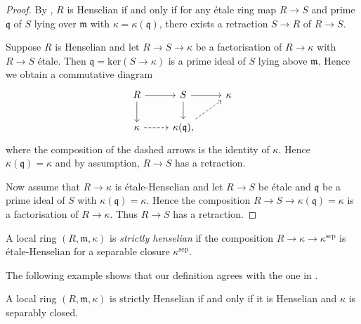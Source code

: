 \begin{proof}
    By {\cite[\href{https://stacks.math.columbia.edu/tag/04GG}{Tag 04GG}]{stacks-project}}, $R$ is Henselian if and only if
    for any étale ring map $R \to S$ and prime $\mathfrak{q}$ of $S$ lying over $\mathfrak{m}$ with $\kappa = \kappa(\mathfrak{q})$,
    there exists a retraction $S \to R$ of $R \to S$.

    Suppose $R$ is Henselian and let $R \to S \to \kappa$ be a factorisation of $R \to \kappa$ with $R \to S$ étale. Then
    $\mathfrak{q} = \mathrm{ker}(S \to \kappa)$ is a prime ideal of $S$ lying above $\mathfrak{m}$. Hence we obtain a commutative
    diagram
    \[
        \begin{tikzcd}
        R \arrow{r} \arrow{d} & S \arrow{r} \arrow{d} & \kappa \\
        \kappa \arrow[dashed]{r} & \kappa(\mathfrak{q}) \arrow[dashed]{ur},
        \end{tikzcd}
    \] where the composition of the dashed arrows is the identity of $\kappa$. Hence $\kappa(\mathfrak{q}) = \kappa$ and by assumption,
    $R \to S$ has a retraction.

    Now assume that $R \to \kappa$ is étale-Henselian and let $R \to S$ be étale and $\mathfrak{q}$ be a prime ideal of $S$ with
    $\kappa(\mathfrak{q}) = \kappa$. Hence the composition $R \to S \to \kappa(\mathfrak{q}) = \kappa$ is a factorisation
    of $R \to \kappa$. Thus $R \to S$ has a retraction.
\end{proof}


\begin{definition}
    \label{def:strictly-henselian-local-ring}
    A local ring $(R, \mathfrak{m}, \kappa)$ is \emph{strictly henselian} if the composition $R \to \kappa \to \kappa^{\mathrm{sep}}$ is étale-Henselian
    for a separable closure $\kappa^{\mathrm{sep}}$.
\end{definition}

The following example shows that our definition agrees with the one in
\cite[\href{https://stacks.math.columbia.edu/tag/04GF}{Tag 04GF}]{stacks-project}.

\begin{example}
    A local ring $(R, \mathfrak{m}, \kappa)$ is strictly Henselian if and only if it is Henselian and $\kappa$ is separably closed.
\end{example}

